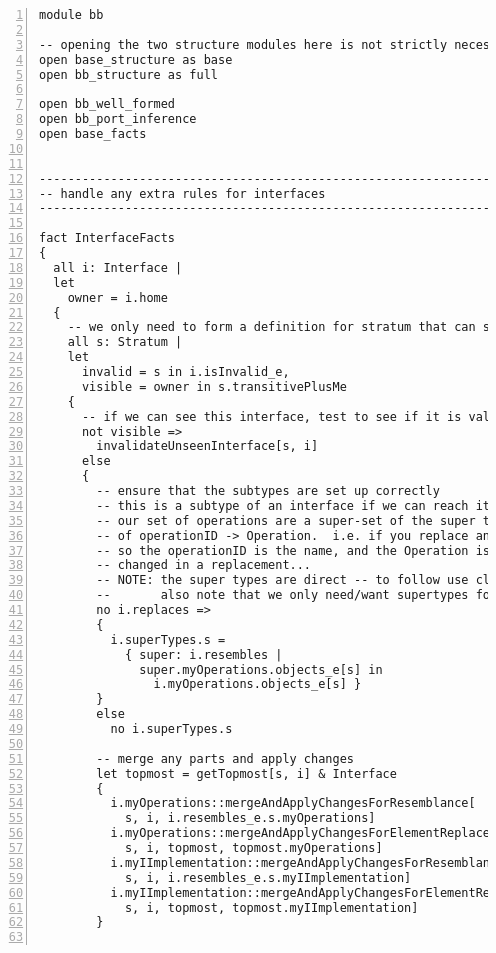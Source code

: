 \lstset{frame=tb, aboveskip=12pt, belowskip=-3pt, breaklines=true, tabsize=2, mathescape=true}
\begin{lstlisting}[caption={bb.als}, numbers=left]
module bb

-- opening the two structure modules here is not strictly necessary, but it simplifies the naming
open base_structure as base
open bb_structure as full

open bb_well_formed
open bb_port_inference
open base_facts


--------------------------------------------------------------------
-- handle any extra rules for interfaces
--------------------------------------------------------------------

fact InterfaceFacts
{
  all i: Interface |
  let
    owner = i.home
  {
    -- we only need to form a definition for stratum that can see us
    all s: Stratum |
    let
      invalid = s in i.isInvalid_e,
      visible = owner in s.transitivePlusMe
    {
      -- if we can see this interface, test to see if it is valid in this stratum
      not visible =>
        invalidateUnseenInterface[s, i]
      else
      {
        -- ensure that the subtypes are set up correctly
        -- this is a subtype of an interface if we can reach it transitively and
        -- our set of operations are a super-set of the super type's
        -- of operationID -> Operation.  i.e. if you replace an operationID you are breaking subtype
        -- so the operationID is the name, and the Operation is the full spec which is assumed to have
        -- changed in a replacement...
        -- NOTE: the super types are direct -- to follow use closure
        --       also note that we only need/want supertypes for non-primes
        no i.replaces =>
        {
          i.superTypes.s =
            { super: i.resembles |
              super.myOperations.objects_e[s] in
                i.myOperations.objects_e[s] }
        }
        else
          no i.superTypes.s
      
        -- merge any parts and apply changes
        let topmost = getTopmost[s, i] & Interface
        {
          i.myOperations::mergeAndApplyChangesForResemblance[
            s, i, i.resembles_e.s.myOperations]
          i.myOperations::mergeAndApplyChangesForElementReplacement[
            s, i, topmost, topmost.myOperations]
          i.myIImplementation::mergeAndApplyChangesForResemblance[
            s, i, i.resembles_e.s.myIImplementation]
          i.myIImplementation::mergeAndApplyChangesForElementReplacement[
            s, i, topmost, topmost.myIImplementation]
        }


\end{lstlisting}
